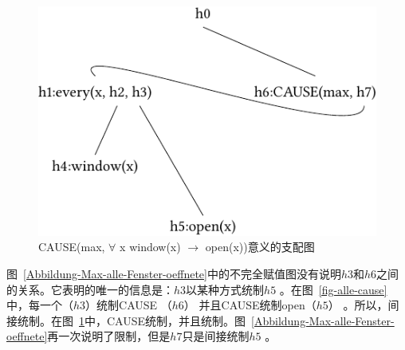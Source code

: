\begin{figure}
\centering

\includegraphics{Figures/solution-mrs-cause-all-open-cropped.pdf}
\caption{ CAUSE(max, $\forall$ x window(x) $\to$ open(x))意义的支配图\label{fig-cause-alle}}
\end{figure}%
图~\ref{Abbildung-Max-alle-Fenster-oeffnete}中的不完全赋值图没有说明$h3$和$h6$之间的关系。它表明的唯一的信息是：$h3$以某种方式统制$h5$ 。在图~\ref{fig-alle-cause}中，每一个（$h3$）统制CAUSE （$h6$） 并且CAUSE统制open（$h5$） 。所以，间接统制。在图~\ref{fig-cause-alle}中，CAUSE统制，并且统制。图~\ref{Abbildung-Max-alle-Fenster-oeffnete}再一次说明了限制，但是$h7$只是间接统制$h5$ 。

